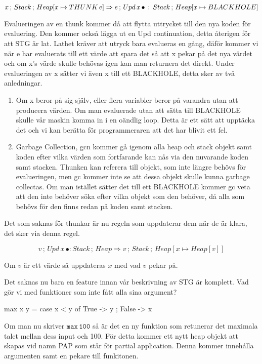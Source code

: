 \documentclass[../Core]{subfiles}
\begin{document}
\[
x\,;\, Stack\,;\, Heap[x\mapsto THUNK\,e]\Rightarrow e\,;\, Upd\, x\,\bullet\,:\, Stack\,;\, Heap[x\mapsto BLACKHOLE]\]


Evalueringen av en thunk kommer då att flytta uttrycket till den nya
koden för evaluering. Den kommer också lägga ut en Upd continuation,
detta återigen för att STG är lat. Lathet kräver att utryck bara evalueras
en gång, däför kommer vi när e har evaluerats till ett värde att spara
det så att x pekar på det nya värdet och om x's värde skulle behövas
igen kan man returnera det direkt. Under evalueringen av x sätter
vi även x till ett BLACKHOLE, detta sker av två anledningar. 
\begin{enumerate}
\item Om x beror på sig själv, eller flera variabler beror på varandra utan
att producera värden. Om man evaluerade utan att sätta till BLACKHOLE
skulle vår maskin komma in i en oändlig loop. Detta är ett sätt att
upptäcka det och vi kan berätta för programmeraren att det har blivit
ett fel.
\item Garbage Collection, gcn kommer gå igenom alla heap och stack objekt
samt koden efter vilka värden som fortfarande kan nås via den nuvarande
koden samt stacken. Thunken kan referera till objekt, som inte längre
behövs för evalueringen, men gc kommer inte se att dessa objekt skulle
kunna garbage collectas. Om man istället sätter det till ett BLACKHOLE
kommer gc veta att den inte behöver söka efter vilka objekt som den
behöver, då alla som behövs för den finns redan på koden samt stacken.
\end{enumerate}
Det som saknas för thunkar är nu regeln som uppdaterar dem när de
är klara, det sker via denna regel.

\[
v\,;\, Upd\, x\,\bullet:Stack\,;\, Heap\Rightarrow v\,;\, Stack\,;\, Heap[x\mapsto Heap[v]]\]


Om $v$ är ett värde så uppdateras $x$ med vad $v$ pekar på.

Det saknas nu bara en feature innan vår beskrivning av STG är komplett.
Vad gör vi med funktioner som inte fått alla sina argument? 

\begin{codeEx}
max x y = case x < y of
    { True  -> y
    ; False -> x
    }
\end{codeEx}

Om man nu skriver $\mathtt{max\,100}$ så är det en ny funktion som
retunerar det maximala talet mellan dess input och 100. För detta
kommer ett nytt heap objekt att skapas vid namn PAP som står för partial
application. Denna kommer innehålla argumenten samt en pekare till
funkitonen. 
\end{document}
